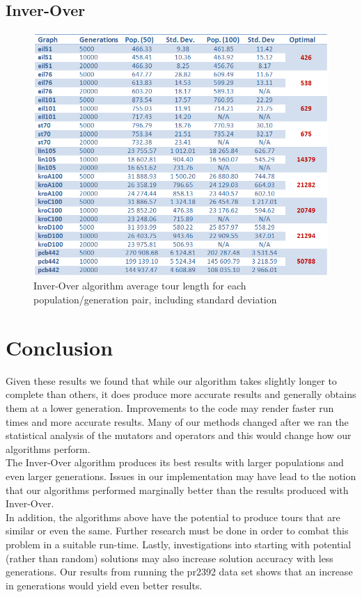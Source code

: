 \documentclass[a4paper,12pt]{article}
\begin{document}
\subsection{Inver-Over}
\begin{figure}[h]
\centering
\includegraphics[width=\linewidth]{IV_Pop50_100.png}
\caption{Inver-Over algorithm average tour length for each population/generation pair, including standard deviation}
\end{figure}

\newpage
\section{Conclusion}
Given these results we found that while our algorithm takes slightly longer to complete than others, it does produce more accurate results and generally obtains them at a lower generation. Improvements to the code may render faster run times and more accurate results. Many of our methods changed after we ran the statistical analysis of the mutators and operators and this would change how our algorithms perform.\\

The Inver-Over algorithm produces its best results with larger populations and even larger generations. Issues in our implementation may have lead to the notion that our algorithms performed marginally better than the results produced with Inver-Over.\\

In addition, the algorithms above have the potential to produce tours that are similar or even the same. Further research must be done in order to combat this problem in a suitable run-time. Lastly, investigations into starting with potential (rather than random) solutions may also increase solution accuracy with less generations. Our results from running the pr2392 data set shows that an increase in generations would yield even better results.
\end{document}
